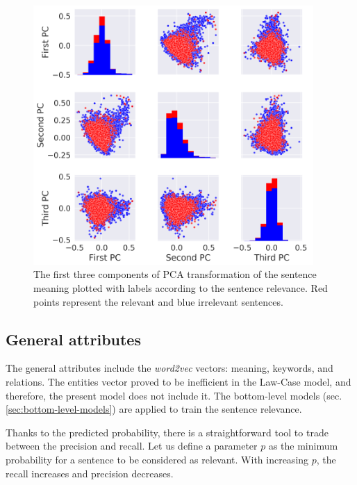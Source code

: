 \documentclass[
  digital, %
  notable,   %
  nolof,     %
  nolot,     %
]{fithesis3}
\begin{document}
\begin{figure}[H]
\caption{The first three components of PCA transformation of the sentence meaning plotted with labels according to the sentence relevance. Red points represent the relevant and blue irrelevant sentences.}
\label{fig:PCA_sent_relevance}
\includegraphics[width=0.95\textwidth]{img/PCA_sent_relevance}
\end{figure}

\subsection{General attributes}
The general attributes include the \textit{word2vec} vectors: meaning, keywords, and relations.
The entities vector proved to be inefficient in the Law-Case model, and therefore, the present model does not include it.
The bottom-level models (sec. \ref{sec:bottom-level-models}) are applied to train the sentence relevance.

Thanks to the predicted probability, there is a straightforward tool to trade between the precision and recall.
Let us define a parameter $p$ as the minimum probability for a sentence to be considered as relevant.
With increasing $p$, the recall increases and precision decreases.
\end{document}
